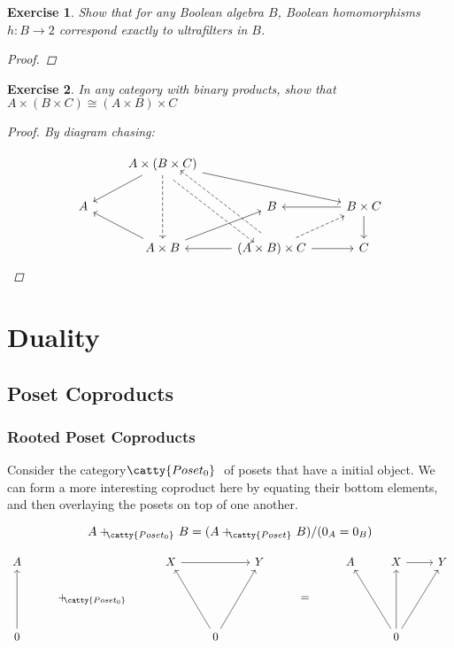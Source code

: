 \documentclass[]{article}
\newtheorem{exercise}{Exercise}
\newcommand{\tfarr}[4][\to]{\ensuremath{#2 : #3 #1 #4}}
\newcommand{\cat}[1]{\ensuremath{\!\! \catty{#1} \,\,}}
\begin{document}
\begin{exercise}
  Show that for any Boolean algebra $B$, Boolean homomorphisms \tfarr{h}{B}{2}
  correspond exactly to ultrafilters in $B$.
  \begin{proof}
    \todo{}
  \end{proof}
\end{exercise}

\begin{exercise}
  In any category with binary products, show that $A\times (B\times C) \cong
  (A\times B)\times C$

  \begin{proof}
    By diagram chasing:

$$\begin{tikzcd}
  & A\times (B\times C) \arrow{dl} \arrow[dashed]{dd} \arrow[dashed, shift right=2]{ddr} \arrow{drr} & & \\
  A & & B & B \times C \arrow{l} \arrow{d} \\
  & A\times B \arrow{ul} \arrow{ur} & (A \times B) \times C \arrow[dashed,
  shift right=2]{uul} \arrow{l} \arrow{r} \arrow[dashed]{ur} & C
\end{tikzcd}$$
  \end{proof}
\end{exercise}


\section{Duality}

\subsection{Poset Coproducts}


\subsubsection{Rooted Poset Coproducts}

Consider the category \cat{Poset_0} of posets that have a initial object.  We
can form a more interesting coproduct here by equating their bottom elements,
and then overlaying the posets on top of one another.

$$
A +_{\cat{Poset_0}} \!B = (A +_{\cat{Poset}} \!B)/(0_A = 0_B)
$$

$$\begin{tikzcd}
  A &   & X\arrow{rr} &   & Y &   & A & X\arrow{r} & Y \\
    & +_{\cat{Poset_0}} &   &   &   & = &   &   &   \\
  0\arrow{uu} &   &   & 0\arrow{uul}\arrow{uur} &   &   &   & 0
  \arrow{uul}\arrow{uu}\arrow{uur} &   \\
\end{tikzcd}
$$
\end{document}
